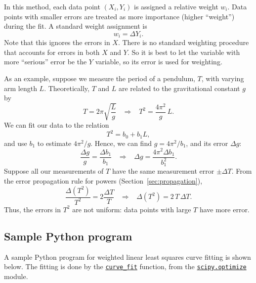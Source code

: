 \documentclass[11pt,a4paper]{article}
\begin{document}
In this method, each data point $(X_i,Y_i)$ is assigned a relative
weight $w_i$.  Data points with smaller errors are treated as more
importance (higher ``weight'') during the fit.  A standard weight
assignment is
\begin{equation*}
  w_i = \Delta Y_i.
  \label{weighting}
\end{equation*}
Note that this ignores the errors in $X$.  There is no standard
weighting procedure that accounts for errors in both $X$ and $Y$.  So
it is best to let the variable with more ``serious'' error be the $Y$
variable, so its error is used for weighting.

As an example, suppose we measure the period of a pendulum, $T$, with
varying arm length $L$.  Theoretically, $T$ and $L$ are related to the
gravitational constant $g$ by
\begin{equation*}
  T = 2\pi \sqrt{\frac{L}{g}} \;\;\; \Rightarrow \;\;\; T^2 = \frac{4\pi^2}{g} \, L.
\end{equation*}
We can fit our data to the relation
\begin{equation*}
  T^2 = b_0 + b_1 L,
\end{equation*}
and use $b_1$ to estimate $4\pi^2/g$.  Hence, we can find $g =
4\pi^2/b_1$, and its error $\Delta g$:
\begin{equation*}
  \frac{\Delta g}{g} = \frac{\Delta b_1}{b_1} \;\;\;\Rightarrow\;\;\;
  \Delta g = \frac{4\pi^2\Delta b_1}{b_1^2}.
\end{equation*}
Suppose all our measurements of $T$ have the same measurement error
$\pm \Delta T$.  From the error propagation rule for powers
(Section~\ref{sec:propagation}),
\begin{equation*}
  \frac{\Delta (T^2)}{T^2} = 2 \frac{\Delta T}{T} \;\;\;\Rightarrow
  \;\;\; \Delta (T^2) = 2\,T\,\Delta T.
\end{equation*}
Thus, the errors in $T^2$ are not uniform: data points with large $T$
have more error.

\subsection{Sample Python program}

A sample Python program for weighted linear least squares curve
fitting is shown below.  The fitting is done by the
\href{https://docs.scipy.org/doc/scipy/reference/generated/scipy.optimize.curve_fit.html}{\texttt{curve\_fit}}
function, from the
\href{https://docs.scipy.org/doc/scipy/reference/optimize.html}{\texttt{scipy.optimize}}
module.
\end{document}

